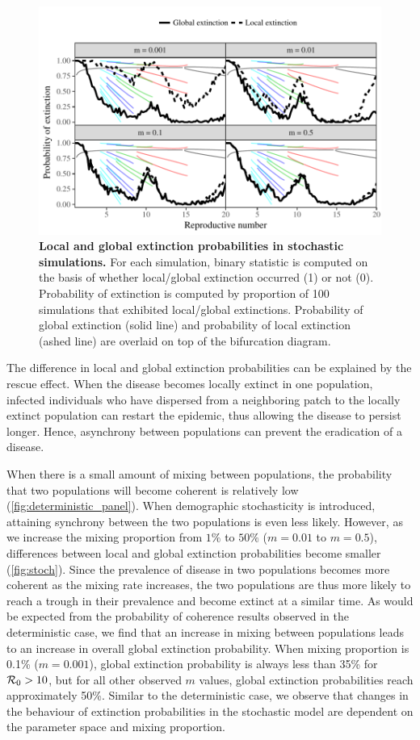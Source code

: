 \documentclass[12pt]{article}
\newcommand{\R}{{\cal R}}
\begin{document}
\begin{figure}[h]
    \centering
    \includegraphics[width=\textwidth]{supplementary/stochastic.pdf}
    \caption{
    \textbf{Local and global extinction probabilities in stochastic simulations.}
    For each simulation, binary statistic is computed on the basis of whether local/global extinction occurred (1) or not (0). Probability of extinction is computed by proportion of 100 simulations that exhibited local/global extinctions.
    Probability of global extinction (solid line) and probability of local extinction (ashed line) are overlaid on top of the bifurcation diagram.
    }
    \label{fig:stoch}
\end{figure}

The difference in local and global extinction probabilities can be explained by the rescue effect. 
When the disease becomes locally extinct in one population, infected individuals who have dispersed from a neighboring patch to the locally extinct population can restart the epidemic, thus allowing the disease to persist longer. 
Hence, asynchrony between populations can prevent the eradication of a disease.

When there is a small amount of mixing between populations, the probability that two populations will become coherent is relatively low (\autoref{fig:deterministic_panel}).
When demographic stochasticity is introduced, attaining synchrony between the two populations is even less likely. 
However, as we increase the mixing proportion from $1\%$ to $50\%$ ($m=0.01$ to $m=0.5$), differences between local and global extinction probabilities become smaller (\autoref{fig:stoch}).
Since the prevalence of disease in two populations becomes more coherent as the mixing rate increases, the two populations are thus more likely to reach a trough in their prevalence and become extinct at a similar time. 
As would be expected from the probability of coherence results observed in the deterministic case, we find that an increase in mixing between populations leads to an increase in overall global extinction probability. When mixing proportion is 0.1\% ($m = 0.001$), global extinction probability is always less than 35\% for $\R_0 > 10$, but for all other observed $m$ values, global extinction probabilities reach approximately 50\%. 
Similar to the deterministic case, we observe that changes in the behaviour of extinction probabilities in the stochastic model are dependent on the parameter space and mixing proportion.
\end{document}
